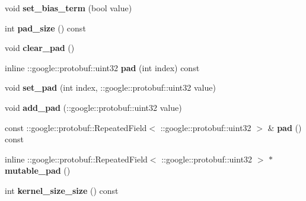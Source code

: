 \begin{DoxyCompactItemize}
\item 
\mbox{\label{classcaffe_1_1_convolution_parameter_abfec019e40e28ab60889ac5c203d3698}} 
void {\bfseries set\+\_\+bias\+\_\+term} (bool value)
\item 
\mbox{\label{classcaffe_1_1_convolution_parameter_a8810cea9da981944597dc10844a32ab6}} 
int {\bfseries pad\+\_\+size} () const
\item 
\mbox{\label{classcaffe_1_1_convolution_parameter_a5e45e7fb6c3e7e553eab8f12a5053faf}} 
void {\bfseries clear\+\_\+pad} ()
\item 
\mbox{\label{classcaffe_1_1_convolution_parameter_ac01c41e70ee67e854430c35b77d9d132}} 
inline \+::google\+::protobuf\+::uint32 {\bfseries pad} (int index) const
\item 
\mbox{\label{classcaffe_1_1_convolution_parameter_a2190f5de5bf94a91dafe51ccaa21fc10}} 
void {\bfseries set\+\_\+pad} (int index, \+::google\+::protobuf\+::uint32 value)
\item 
\mbox{\label{classcaffe_1_1_convolution_parameter_a451e196706315fe282848727fc0d4542}} 
void {\bfseries add\+\_\+pad} (\+::google\+::protobuf\+::uint32 value)
\item 
\mbox{\label{classcaffe_1_1_convolution_parameter_a182121618de84eff9ae980c1f5b92d65}} 
const \+::google\+::protobuf\+::\+Repeated\+Field$<$ \+::google\+::protobuf\+::uint32 $>$ \& {\bfseries pad} () const
\item 
\mbox{\label{classcaffe_1_1_convolution_parameter_ad26a3178154de2a98e68fd4b947ff125}} 
inline \+::google\+::protobuf\+::\+Repeated\+Field$<$ \+::google\+::protobuf\+::uint32 $>$ $\ast$ {\bfseries mutable\+\_\+pad} ()
\item 
\mbox{\label{classcaffe_1_1_convolution_parameter_a5f521b5a78b7cadcd96c6bacedc54e3a}} 
int {\bfseries kernel\+\_\+size\+\_\+size} () const

\end{DoxyCompactItemize}
